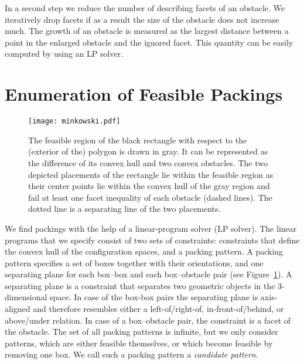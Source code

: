 \documentclass{article}
\begin{document}
In a second step we reduce the number of describing facets of an
obstacle. We iteratively drop facets if as a result the size of the
obstacle does not increase much. The growth of an obstacle is measured
as the largest distance between a point in the enlarged obstacle and
the ignored facet. This quantity can be easily computed by using an
LP solver.

\section{Enumeration of Feasible Packings}
\label{sec:enumeration}

\begin{figure}[t]
\center
\texttt{[image: minkowski.pdf]}
\caption{
\label{fig:pattern}
  The feasible region of the black rectangle with respect to the
  (exterior of the) polygon is drawn in gray. It can be represented as
  the difference of its convex hull and two convex obstacles. The two
  depicted placements of the rectangle lie within the feasible region
  as their center points lie within the convex hull of the gray region
  and fail at least one facet inequality of each obstacle (dashed
  lines). The dotted line is a separating line of the two placements.}
\end{figure}

We find packings with the help of a linear-program solver (LP solver).
The linear programs that we specify consist of two sets of
constraints: constraints that define the convex hull of the
configuration spaces, and a packing pattern. A packing pattern
specifies a set of boxes together with their orientations, and one
separating plane for each box--box and each box--obstacle pair (see
Figure~\ref{fig:pattern}). A separating plane is a constraint that
separates two geometric objects in the 3-dimensional space. In case of
the box-box pairs the separating plane is axis-aligned and therefore
resembles either a left-of/right-of, in-front-of/behind, or
above/under relation. In case of a box--obstacle pair, the constraint
is a facet of the obstacle. The set of all packing patterns is
infinite, but we only consider patterns, which are either feasible
themselves, or which become feasible by removing one box. We call such
a packing pattern a \emph{candidate pattern}.
\end{document}

